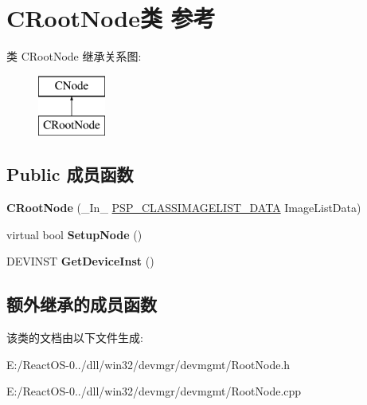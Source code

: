 \hypertarget{class_c_root_node}{}\section{C\+Root\+Node类 参考}
\label{class_c_root_node}
类 C\+Root\+Node 继承关系图\+:\begin{figure}[H]
\begin{center}
\leavevmode
\includegraphics[height=2.000000cm]{class_c_root_node}
\end{center}
\end{figure}
\subsection*{Public 成员函数}
\begin{DoxyCompactItemize}
\item 
\mbox{\label{class_c_root_node_aeadc135564ed53c0765c582600eed16d}} 
{\bfseries C\+Root\+Node} (\+\_\+\+In\+\_\+ \hyperlink{struct___s_p___c_l_a_s_s_i_m_a_g_e_l_i_s_t___d_a_t_a}{P\+S\+P\+\_\+\+C\+L\+A\+S\+S\+I\+M\+A\+G\+E\+L\+I\+S\+T\+\_\+\+D\+A\+TA} Image\+List\+Data)
\item 
\mbox{\label{class_c_root_node_a013182ceec106dcec4658919223c2ea4}} 
virtual bool {\bfseries Setup\+Node} ()
\item 
\mbox{\label{class_c_root_node_af618dfdb140ff15d4a6e3b3b2280b53c}} 
D\+E\+V\+I\+N\+ST {\bfseries Get\+Device\+Inst} ()
\end{DoxyCompactItemize}
\subsection*{额外继承的成员函数}


该类的文档由以下文件生成\+:\begin{DoxyCompactItemize}
\item 
E\+:/\+React\+O\+S-\/0../dll/win32/devmgr/devmgmt/Root\+Node.\+h\item 
E\+:/\+React\+O\+S-\/0../dll/win32/devmgr/devmgmt/Root\+Node.\+cpp\end{DoxyCompactItemize}
